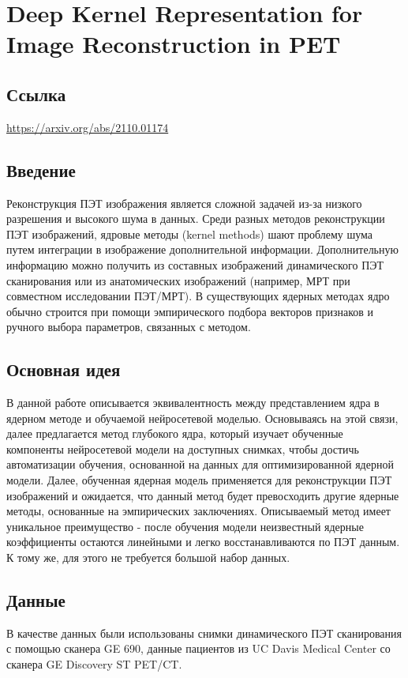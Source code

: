 \section{Deep Kernel Representation for Image Reconstruction in PET}

\subsection*{Ссылка} \url{https://arxiv.org/abs/2110.01174}
\subsection*{Введение} 
Реконструкция ПЭТ изображения является сложной задачей из-за низкого разрешения и высокого шума в данных. 
Среди разных методов реконструкции ПЭТ изображений, ядровые методы (kernel methods) шают проблему шума 
путем интеграции в изображение дополнительной информации. Дополнительную информацию можно получить из 
составных изображений динамического ПЭТ сканирования или из анатомических изображений (например, МРТ при совместном исследовании ПЭТ/МРТ). 
В существующих ядерных методах ядро обычно строится при помощи эмпирического подбора векторов признаков и ручного выбора параметров, связанных с методом.
\subsection*{Основная идея}
В данной работе описывается эквивалентность между представлением ядра в ядерном методе и 
обучаемой нейросетевой моделью. Основываясь на этой связи, далее предлагается метод \glqq глубокого ядра\grqq, 
который изучает обученные компоненты нейросетевой модели на доступных снимках, чтобы достичь автоматизации обучения, 
основанной на данных для оптимизированной ядерной модели. Далее, обученная ядерная модель применяется для реконструкции 
ПЭТ изображений и ожидается, что данный метод будет превосходить другие ядерные методы, основанные на эмпирических заключениях. 
Описываемый метод имеет уникальное преимущество - после обучения модели неизвестный ядерные коэффициенты остаются линейными и 
легко восстанавливаются по ПЭТ данным. К тому же, для этого не требуется большой набор данных.
\subsection*{Данные}
В качестве данных были использованы снимки динамического ПЭТ сканирования с помощью сканера GE 690, 
данные пациентов из UC Davis Medical Center со сканера GE Discovery ST PET/CT.
